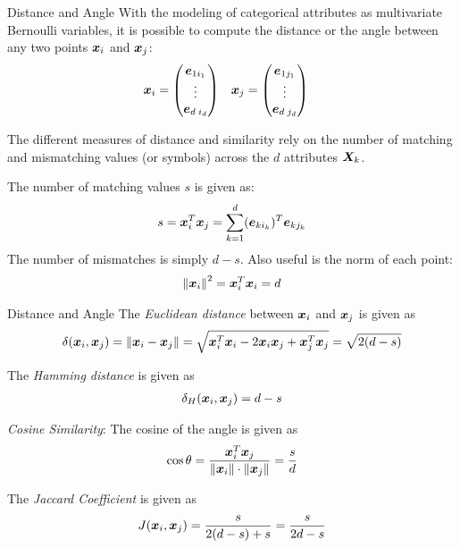 \begin{frame}{Distance and Angle}
With the modeling of categorical attributes as multivariate
Bernoulli
variables, it is possible to compute the distance or the angle
between any two points ${\boldsymbol x}_i$ and ${\boldsymbol x}_{j}$:
\begin{align*}
    {\boldsymbol x}_i & = \begin{pmatrix} {\boldsymbol e}_{1i_1}\\\vdots\\ {\boldsymbol e}_{d\;i_d} \end{pmatrix} &
    {\boldsymbol x}_{j} & = \begin{pmatrix} {\boldsymbol e}_{1j_1}\\\vdots\\ {\boldsymbol e}_{d\;j_d} \end{pmatrix}
\end{align*}

The different measures of distance and similarity rely on the
number of matching and mismatching values (or symbols) across the
$d$ attributes ${\boldsymbol X}_k$. 

The number
of matching values $s$ is given as:
\begin{align*}
    s = {\boldsymbol x}_i^T{\boldsymbol x}_{j} = \sum_{k=1}^d ({\boldsymbol e}_{ki_k})^T{\boldsymbol e}_{kj_k}
\end{align*}
The number of mismatches is simply $d-s$.
Also useful is the norm of each point:
\begin{align*}
\left\lVert{\boldsymbol x}_i\right\rVert^2 = {\boldsymbol x}_i^T{\boldsymbol x}_i = d
\end{align*}
\end{frame}



\begin{frame}{Distance and Angle}
The {\em Euclidean distance} between ${\boldsymbol x}_i$ and ${\boldsymbol x}_{j}$ is given as
\begin{align*}
    \delta({\boldsymbol x}_i, {\boldsymbol x}_{j}) = \left\lVert{\boldsymbol x}_i-{\boldsymbol x}_{j}\right\rVert =
    \sqrt{{\boldsymbol x}_i^T{\boldsymbol x}_i - 2{\boldsymbol x}_i{\boldsymbol x}_{j} + {\boldsymbol x}_{j}^T{\boldsymbol x}_{j}} =
    \sqrt{2(d-s)}
\end{align*}


The {\em Hamming distance} is given as
\begin{align*}
    \delta_H({\boldsymbol x}_i, {\boldsymbol x}_{j}) = d-s
\end{align*}

{\em Cosine Similarity}:
The cosine of the angle is given as
\begin{align*}
    \cos \theta = {\bx_i^T \bx_{j} \over \norm{\vphantom{\norm{\bx_{j}}}\bx_i} \cdot
    \norm{\bx_{j}}} = {s \over d}
\end{align*}

The {\em Jaccard Coeff\/{i}cient} is given as
\begin{align*}
    J({\boldsymbol x}_i, {\boldsymbol x}_{j}) = {s \over 2(d-s) + s} = {s \over 2d-s}
\end{align*}

\end{frame}


